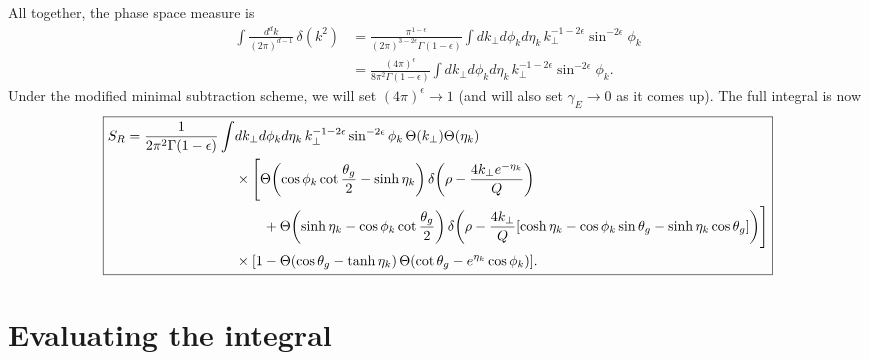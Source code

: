\documentclass[11pt,twoside,reqno]{amsart}
\theoremstyle{plain}
\theoremstyle{remark}
\theoremstyle{definition}
\theoremstyle{remark}
\theoremstyle{definition}
\theoremstyle{definition}
\begin{document}
	All together, the phase space measure is
	\begin{equation}
	\begin{aligned}
		\int \frac{d^d k}{(2\pi)^{d-1}}\,\delta(k^2) &= \frac{\pi^{1-\epsilon}}{(2\pi)^{3-2\epsilon}\Gamma(1 - \epsilon)}\int dk_\perp d\phi_k d\eta_k \, k_\perp^{-1-2\epsilon} \sin^{-2\epsilon}\phi_k \\
		&= \frac{(4\pi)^\epsilon}{8\pi^2 \Gamma(1-\epsilon)} \int dk_\perp d\phi_k d\eta_k\,k_\perp^{-1-2\epsilon} \sin^{-2\epsilon}\phi_k.
	\end{aligned}
	\end{equation}
	Under the modified minimal subtraction scheme, we will set $(4\pi)^\epsilon \to 1$ (and will also set $\gamma_E \to 0$ as it comes up). The full integral is now
	\begin{equation}
	\boxed{
	\begin{aligned}
		S_R = \frac{1}{2\pi^2\Gamma(1 - \epsilon)} \int& dk_\perp d\phi_k d\eta_k\, k_\perp^{-1-2\epsilon} \sin^{-2\epsilon}\phi_k \, \Theta(k_\perp)\Theta(\eta_k) \\
		&\times \Bigg[ \Theta\qty(\cos\phi_k\cot\frac{\theta_g}{2} - \sinh\eta_k)\,\delta\qty(\rho - \frac{4 k_\perp e^{-\eta_k}}{Q}) \\
			&\qquad+ \Theta\qty(\sinh\eta_k - \cos\phi_k\cot\frac{\theta_g}{2})\, \delta\qty(\rho - \frac{4 k_\perp}{Q}\qty[\cosh\eta_k - \cos\phi_k\sin\theta_g - \sinh\eta_k\cos\theta_g])\Bigg] \\
			&\times \qty[1 - \Theta(\cos\theta_g - \tanh\eta_k)\,\Theta\qty(\cot\theta_g - e^{\eta_k}\cos\phi_k)].
	\end{aligned}
	}
	\end{equation}

\section{Evaluating the integral}
\end{document}
